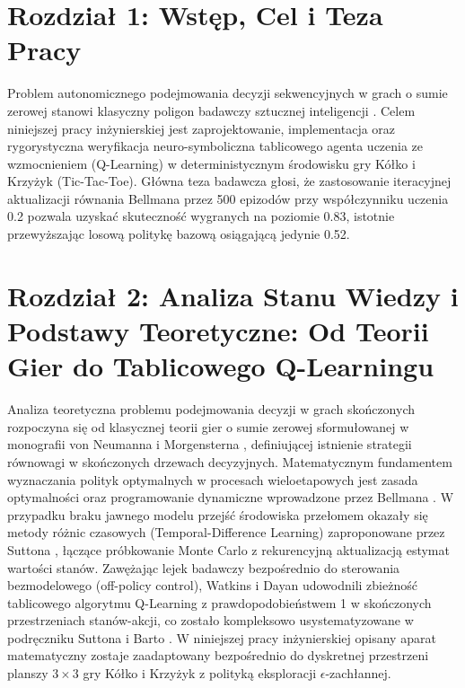 \documentclass[W2, polski]{ThesisPLodz}
\begin{document}
\chapter{Rozdział 1: Wstęp, Cel i Teza Pracy}
Problem autonomicznego podejmowania decyzji sekwencyjnych w grach o sumie zerowej stanowi klasyczny poligon badawczy sztucznej inteligencji \cite{sutton2018reinforcement}. Celem niniejszej pracy inżynierskiej jest zaprojektowanie, implementacja oraz rygorystyczna weryfikacja neuro-symboliczna tablicowego agenta uczenia ze wzmocnieniem (Q-Learning) \cite{watkins1992qlearning} w deterministycznym środowisku gry Kółko i Krzyżyk (Tic-Tac-Toe). Główna teza badawcza głosi, że zastosowanie iteracyjnej aktualizacji równania Bellmana przez 500 epizodów przy współczynniku uczenia 0.2 pozwala uzyskać skuteczność wygranych na poziomie 0.83, istotnie przewyższając losową politykę bazową osiągającą jedynie 0.52.

\chapter{Rozdział 2: Analiza Stanu Wiedzy i Podstawy Teoretyczne: Od Teorii Gier do Tablicowego Q-Learningu}
Analiza teoretyczna problemu podejmowania decyzji w grach skończonych rozpoczyna się od klasycznej teorii gier o sumie zerowej sformułowanej w monografii von Neumanna i Morgensterna \cite{vonneumann1944theory}, definiującej istnienie strategii równowagi w skończonych drzewach decyzyjnych. Matematycznym fundamentem wyznaczania polityk optymalnych w procesach wieloetapowych jest zasada optymalności oraz programowanie dynamiczne wprowadzone przez Bellmana \cite{bellman1957dynamic}. W przypadku braku jawnego modelu przejść środowiska przełomem okazały się metody różnic czasowych (Temporal-Difference Learning) zaproponowane przez Suttona \cite{sutton1988learning}, łączące próbkowanie Monte Carlo z rekurencyjną aktualizacją estymat wartości stanów. Zawężając lejek badawczy bezpośrednio do sterowania bezmodelowego (off-policy control), Watkins i Dayan \cite{watkins1992qlearning} udowodnili zbieżność tablicowego algorytmu Q-Learning z prawdopodobieństwem 1 w skończonych przestrzeniach stanów-akcji, co zostało kompleksowo usystematyzowane w podręczniku Suttona i Barto \cite{sutton2018reinforcement}. W niniejszej pracy inżynierskiej opisany aparat matematyczny zostaje zaadaptowany bezpośrednio do dyskretnej przestrzeni planszy $3\times 3$ gry Kółko i Krzyżyk z polityką eksploracji $\epsilon$-zachłannej.
\end{document}
